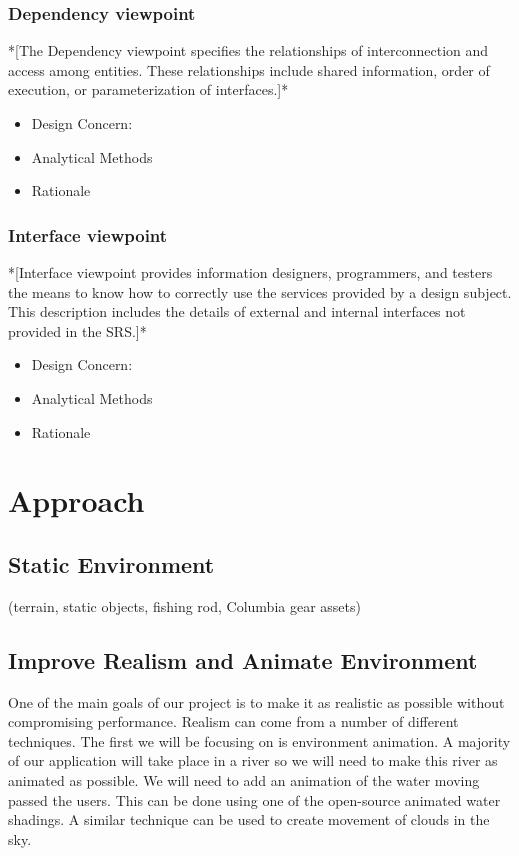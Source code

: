 \documentclass[10pt,journal,compsoc,onecolumn, draftclsnofoot]{IEEEtran}
\begin{document}
\subsubsection{Dependency viewpoint}
*[The Dependency viewpoint specifies the relationships of interconnection and access among entities. These relationships include shared information, order of execution, or parameterization of interfaces.]*
\begin{itemize}
  \item Design Concern:
  \item Analytical Methods
  \item Rationale
\end{itemize}
\subsubsection{Interface viewpoint}
*[Interface viewpoint provides information designers, programmers, and testers the means to know how to correctly use the services provided by a design subject. This description includes the details of external and internal interfaces not provided in the SRS.]*
\begin{itemize}
  \item Design Concern:
  \item Analytical Methods
  \item Rationale
\end{itemize}


\section{Approach}
\subsection{Static Environment}
(terrain, static objects, fishing rod, Columbia gear assets)

\subsection{Improve Realism and Animate Environment}
One of the main goals of our project is to make it as realistic as possible without compromising performance. Realism can come from a number of different techniques. The first we will be focusing on is environment animation. A majority of our application will take place in a river so we will need to make this river as animated as possible. We will need to add an animation of the water moving passed the users. This can be done using one of the open-source animated water shadings. A similar technique can be used to create movement of clouds in the sky.
\end{document}
